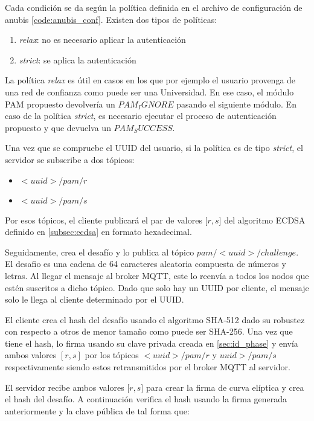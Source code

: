 Cada condición se da según la política definida en el archivo de configuración de anubis \ref{code:anubis_conf}. Existen dos 
tipos de políticas:

\begin{enumerate}
    \item \textit{relax}: no es necesario aplicar la autenticación
    \item \textit{strict}: se aplica la autenticación
\end{enumerate}

La política \textit{relax} es útil en casos en los que por ejemplo el usuario provenga de una red de confianza como puede ser una
Universidad. En ese caso, el módulo PAM propuesto devolvería un $PAM_IGNORE$ pasando el siguiente módulo. En caso de la 
política \textit{strict}, es necesario ejecutar el proceso de autenticación propuesto y que devuelva un $PAM_SUCCESS$.

Una vez que se compruebe el UUID del usuario, si la política es de tipo \textit{strict}, el servidor se subscribe a dos tópicos:

\begin{itemize}
    \item $<uuid>/pam/r$
    \item $<uuid>/pam/s$
\end{itemize}

Por esos tópicos, el cliente publicará el par de valores [$r, s$] del algoritmo ECDSA definido en \ref{subsec:ecdsa} en formato 
hexadecimal.

Seguidamente, crea el desafío y lo publica al tópico $pam/<uuid>/challenge$. El desafio es una cadena de 64 caracteres aleatoria
compuesta de números y letras. Al llegar el mensaje al broker MQTT, este lo reenvía a todos los nodos que estén suscritos a dicho 
tópico. Dado que solo hay un UUID por cliente, el mensaje solo le llega al cliente determinado por el UUID. 

El cliente crea el hash del desafío usando el algoritmo SHA-512 dado su robustez con respecto a otros de menor tamaño como puede 
ser SHA-256. Una vez que tiene el hash, lo firma usando su clave privada creada en \ref{sec:id_phase} y envía ambos valores $[r,s]$ 
por los tópicos $<uuid>/pam/r$ y $uuid>/pam/s$ respectivamente siendo estos retransmitidos por el broker MQTT al servidor.

El servidor recibe ambos valores [$r, s$] para crear la firma de curva elíptica y crea el hash del desafío. A continuación verifica
el hash usando la firma generada anteriormente y la clave pública de tal forma que:

